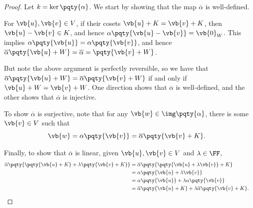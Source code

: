 \begin{proof}
    Let \(k = \ker\pqty{\alpha}\). We start by showing that the map \(\overline{\alpha}\) is well-defined.

    For \(\vb{u}, \vb{v} \in V\), if their cosets \(\vb{u} + K = \vb{v} + K\), then \(\vb{u} - \vb{v} \in K\), and hence \(\alpha\pqty{\vb{u} - \vb{v}} = \vb{0}_W\). This implies \(\alpha\pqty{\vb{u}} = \alpha\pqty{\vb{v}}\), and hence \(\overline{\alpha} \pqty{\vb{u} + W} = \overline{\alpha} = \pqty{\vb{v} + W}\).

    But note the above argument is perfectly reversible, so we have that \(\overline{\alpha} \pqty{\vb{u} + W} = \overline{\alpha} \pqty{\vb{v} + W}\) if and only if \(\vb{u} + W = \vb{v} + W\). One direction shows that \(\overline{\alpha}\) is well-defined, and the other shows that \(\overline{\alpha}\) is injective.

    To show \(\overline{\alpha}\) is surjective, note that for any \(\vb{w} \in \img\pqty{\alpha}\), there is some \(\vb{v} \in V\) such that
    \[
        \vb{w} = \alpha\pqty{\vb{v}} = \overline{\alpha}\pqty{\vb{v} + K}.
    \]

    Finally, to show that \(\overline{\alpha}\) is linear, given \(\vb{u}, \vb{v} \in V\) and \(\lambda \in \FF\),
    \begin{align*}
        \overline{\alpha}\pqty{\pqty{\vb{u} + K} + \lambda \pqty{\vb{v} + K}} &= \overline{\alpha}\pqty{\pqty{\vb{u} + \lambda \vb{v}} + K} \\
        &= \alpha\pqty{\vb{u} + \lambda \vb{v}} \\
        &= \alpha\pqty{\vb{u}} + \lambda \alpha\pqty{\vb{v}} \\
        &= \overline{\alpha}\pqty{\vb{u} + K} + \lambda \overline{\alpha}\pqty{\vb{v} + K}.
    \end{align*}
\end{proof}